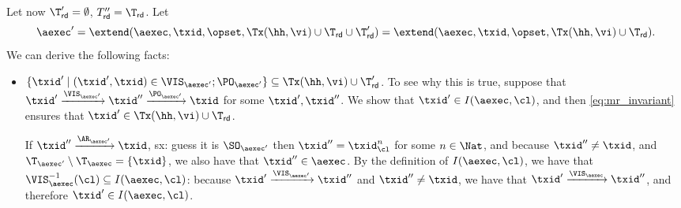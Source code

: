 Let now $\T'_{\mathsf{rd}} = \emptyset$, $T''_{\mathsf{rd}} = \T_{\mathsf{rd}}$. 
Let 
\[ 
\aexec' = \extend(\aexec, \txid, \opset, \Tx(\hh, \vi) \cup \T_{\mathsf{rd}} \cup \T'_{\mathsf{rd}}) = 
\extend(\aexec, \txid, \opset, \Tx(\hh, \vi) \cup \T_{\mathsf{rd}}).\]
We can derive the following facts:
\begin{itemize}
\item $\{\txid' \mid (\txid', \txid) \in \VIS_{\aexec'} ; \PO_{\aexec'} \} \subseteq \Tx(\hh, \vi) \cup \T'_{\mathsf{rd}}$. 
To see why this is true, suppose that $\txid' \xrightarrow{\VIS_{\aexec'}} \txid'' \xrightarrow{\PO_{\aexec'}} \txid$ 
for some $\txid', \txid''$. We show that $\txid' \in I(\aexec, \cl)$, and then \cref{eq:mr_invariant} ensures 
that $\txid' \in \Tx(\hh, \vi) \cup \T_{\mathsf{rd}}$. 

If $\txid'' \xrightarrow{\AR_{\aexec'}} \txid$, {\color{blue} sx: guess it is \( \SO_{\aexec'}\) } then $\txid'' = \txid_{\cl}^{n}$ for some $n \in \Nat$, 
and because $\txid'' \neq \txid$, and $\T_{\aexec'} \setminus \T_{\aexec} = \{ \txid \}$, we also 
have that $\txid'' \in \aexec$. By the definition of $I(\aexec, \cl)$, we have that $\VIS^{-1}_{\aexec}(\cl) \subseteq 
I(\aexec, \cl)$: because $\txid' \xrightarrow{\VIS_{\aexec'}} \txid''$ and $\txid'' \neq \txid$, we have 
that $\txid' \xrightarrow{\VIS_{\aexec}} \txid''$, and therefore $\txid' \in I(\aexec, \cl)$. 


\end{itemize}
